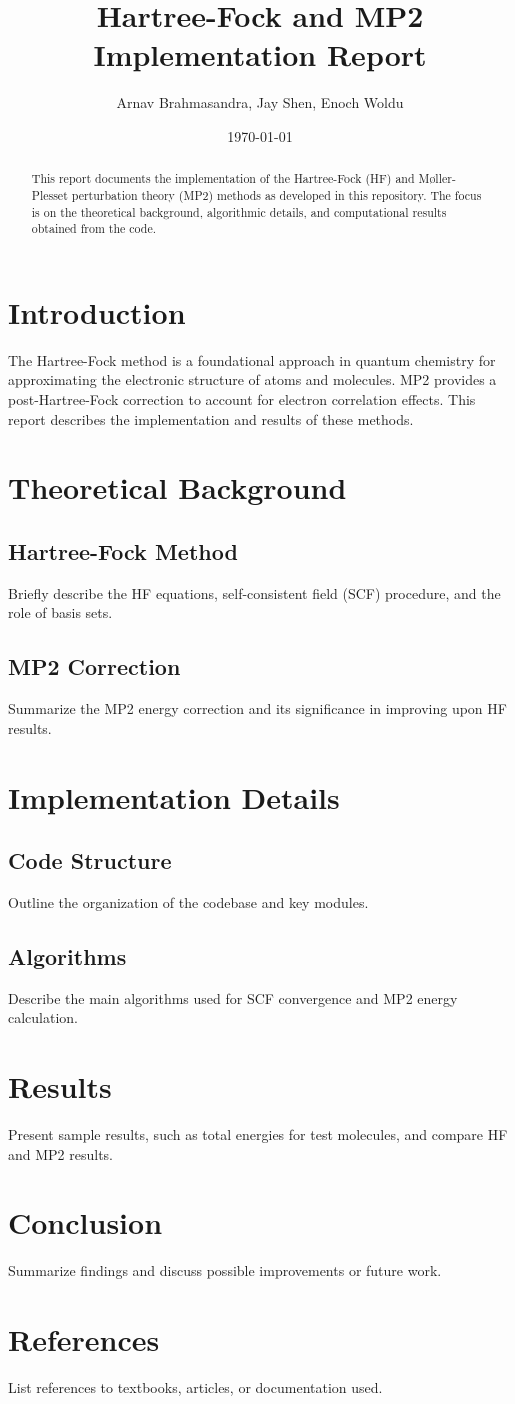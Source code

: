 \documentclass[12pt]{article}
\title{Hartree-Fock and MP2 Implementation Report}
\author{Arnav Brahmasandra, Jay Shen, Enoch Woldu}
\date{\today}
\begin{document}
\maketitle

\begin{abstract}
This report documents the implementation of the Hartree-Fock (HF) and Møller-Plesset perturbation theory (MP2) methods as developed in this repository. The focus is on the theoretical background, algorithmic details, and computational results obtained from the code.
\end{abstract}

\section{Introduction}
The Hartree-Fock method is a foundational approach in quantum chemistry for approximating the electronic structure of atoms and molecules. MP2 provides a post-Hartree-Fock correction to account for electron correlation effects. This report describes the implementation and results of these methods.

\section{Theoretical Background}
\subsection{Hartree-Fock Method}
Briefly describe the HF equations, self-consistent field (SCF) procedure, and the role of basis sets.

\subsection{MP2 Correction}
Summarize the MP2 energy correction and its significance in improving upon HF results.

\section{Implementation Details}

\subsection{Code Structure}
Outline the organization of the codebase and key modules.

\subsection{Algorithms}
Describe the main algorithms used for SCF convergence and MP2 energy calculation.

\section{Results}
Present sample results, such as total energies for test molecules, and compare HF and MP2 results.

\section{Conclusion}
Summarize findings and discuss possible improvements or future work.

\section*{References}
List references to textbooks, articles, or documentation used.
\end{document}
